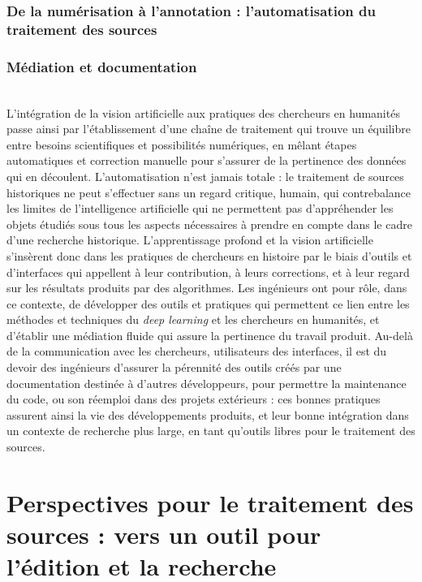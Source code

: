 \documentclass[a4paper,12pt,twoside]{book}
\newcommand{\dl}{\textit{deep learning}\xspace}
\newcommand{\ia}{intelligence artificielle\xspace}
\newcommand{\clearemptydoublepage}{\newpage{\pagestyle{empty}\cleardoublepage}}
\begin{document}
            \section[\textit{Workflow} de traitement des sources]{De la numérisation à l’annotation : l'automatisation du traitement des sources}
                
         
            \section{Médiation et documentation}
                
        	\\
        
        L'intégration de la vision artificielle aux pratiques des chercheurs en humanités passe ainsi par l'établissement d'une chaîne de traitement qui trouve un équilibre entre besoins scientifiques et possibilités numériques, en mêlant étapes automatiques et correction manuelle pour s'assurer de la pertinence des données qui en découlent. L'automatisation n'est jamais totale : le traitement de sources historiques ne peut s'effectuer sans un regard critique, humain, qui contrebalance les limites de l'\ia qui ne permettent pas d'appréhender les objets étudiés sous tous les aspects nécessaires à prendre en compte dans le cadre d'une recherche historique. L'apprentissage profond et la vision artificielle s'insèrent donc dans les pratiques de chercheurs en histoire par le biais d'outils et d'interfaces qui appellent à leur contribution, à leurs corrections, et à leur regard sur les résultats produits par des algorithmes. Les ingénieurs ont pour rôle, dans ce contexte, de développer des outils et pratiques qui permettent ce lien entre les méthodes et techniques du \dl et les chercheurs en humanités, et d'établir une médiation fluide qui assure la pertinence du travail produit. Au-delà de la communication avec les chercheurs, utilisateurs des interfaces, il est du devoir des ingénieurs d'assurer la pérennité des outils créés par une documentation destinée à d'autres développeurs, pour permettre la maintenance du code, ou son réemploi dans des projets extérieurs : ces bonnes pratiques assurent ainsi la vie des développements produits, et leur bonne intégration dans un contexte de recherche plus large, en tant qu'outils libres pour le traitement des sources.
        \clearemptydoublepage

    \part{Perspectives pour le traitement des sources : vers un outil pour l’édition et la recherche}
\end{document}
